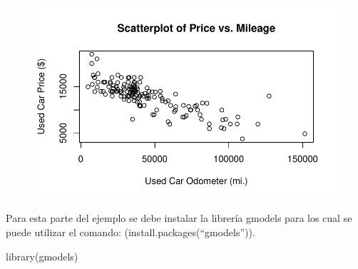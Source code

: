 \documentclass[
  letterpaper,
  DIV=11,
  numbers=noendperiod]{scrartcl}
\newenvironment{Shaded}{\begin{snugshade}}{\end{snugshade}}
\newcommand{\FunctionTok}[1]{\textcolor[rgb]{0.28,0.35,0.67}{#1}}
\newcommand{\NormalTok}[1]{\textcolor[rgb]{0.00,0.23,0.31}{#1}}
\newcommand{\OtherTok}[1]{\textcolor[rgb]{0.00,0.23,0.31}{#1}}
\newcommand{\SpecialCharTok}[1]{\textcolor[rgb]{0.37,0.37,0.37}{#1}}
\newcommand{\StringTok}[1]{\textcolor[rgb]{0.13,0.47,0.30}{#1}}
\begin{document}
\begin{figure}[H]

{\centering \includegraphics{Unidad_1_files/figure-pdf/unnamed-chunk-25-1.pdf}

}

\end{figure}

Para esta parte del ejemplo se debe instalar la librería gmodels para
los cual se puede utilizar el comando: (install.packages(``gmodels'')).

\begin{Shaded}
\begin{Highlighting}[]
\FunctionTok{library}\NormalTok{(gmodels)}
\end{Highlighting}
\end{Shaded}

\begin{Shaded}
\end{Shaded}

\begin{Shaded}
\end{Shaded}
\end{document}
